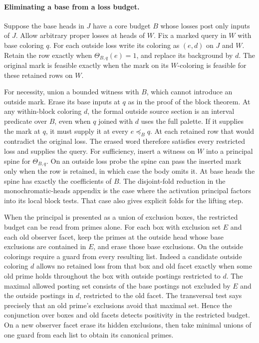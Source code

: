 \paragraph{Eliminating a base from a loss budget.}
Suppose the base heads in $J$ have a core budget $B$ whose
losses post only inputs of $J$. Allow arbitrary proper losses
at heads of $W$. Fix a marked query in $W$ with base coloring
$q$. For each outside loss write its coloring as $(e,d)$ on
$J$ and $W$. Retain the row exactly when $\Theta_{B,q}(e)=1$,
and replace its background by $d$. The original mark is
feasible exactly when the mark on its $W$-coloring is feasible
for these retained rows on $W$.

For necessity, union a bounded witness with $B$, which cannot
introduce an outside mark. Erase its base inputs at $q$ as in
the proof of the block theorem. At any within-block coloring
$d$, the formal outside source section is an interval predicate
over $B$, even when $q$ joined with $d$ uses the full palette.
If it supplies the mark at $q$, it must supply it at every
$e\preceq_B q$. At each retained row that would contradict
the original loss. The erased word therefore satisfies every
restricted loss and supplies the query. For sufficiency, insert
a witness on $W$ into a principal spine for $\Theta_{B,q}$.
On an outside loss probe the spine can pass the inserted mark
only when the row is retained, in which case the body omits it.
At base heads the spine has exactly the coefficients of $B$.
The disjoint-fold reduction in the monochromatic-heads appendix
is the case where the activation principal factors into its
local block tests. That case also gives explicit folds for the
lifting step.

When the principal is presented as a union of exclusion boxes,
the restricted budget can be read from primes alone. For each
box with exclusion set $E$ and each old observer facet, keep
the primes at the outside head whose base exclusions are
contained in $E$, and erase those base exclusions. On the
outside colorings require a guard from every resulting list.
Indeed a candidate outside coloring $d$ allows no retained loss
from that box and old facet exactly when some old prime holds
throughout the box with outside postings restricted to $d$.
The maximal allowed posting set consists of the base postings
not excluded by $E$ and the outside postings in $d$, restricted
to the old facet. The transversal test says precisely that an
old prime's exclusions avoid that maximal set. Hence the
conjunction over boxes and old facets detects positivity in the
restricted budget. On a new observer facet erase its hidden
exclusions, then take minimal unions of one guard from each
list to obtain its canonical primes.


